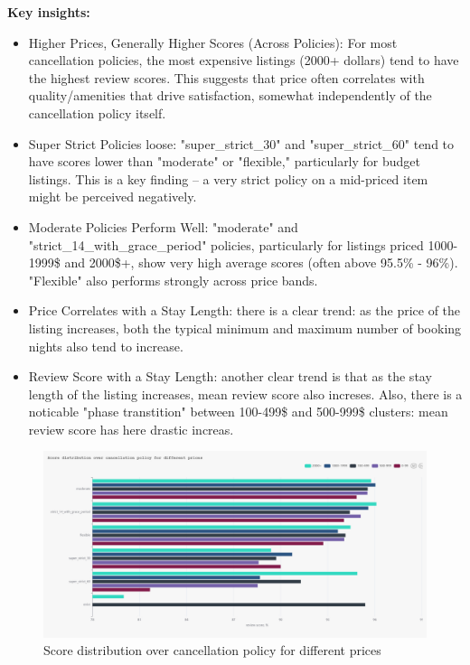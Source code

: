 \vspace{0.5em}
\textbf{Key insights:}
\begin{itemize}
    \item Higher Prices, Generally Higher Scores (Across Policies): For most cancellation policies, the most expensive listings (2000+ dollars) tend to have the highest review scores. This suggests that price often correlates with quality/amenities that drive satisfaction, somewhat independently of the cancellation policy itself.
    \item Super Strict Policies loose: "super\_strict\_30" and "super\_strict\_60" tend to have scores lower than "moderate" or "flexible," particularly for budget listings. This is a key finding – a very strict policy on a mid-priced item might be perceived negatively.
    \item Moderate Policies Perform Well: "moderate" and "strict\_14\_with\_grace\_period" policies, particularly for listings priced 1000-1999\$ and 2000\$+, show very high average scores (often above 95.5\% - 96\%). "Flexible" also performs strongly across price bands.
    \item Price Correlates with a Stay Length: there is a clear trend: as the price of the listing increases, both the typical minimum and maximum number of booking nights also tend to increase.
    \item Review Score with a Stay Length: another clear trend is that as the stay length of the listing increases, mean review score also increses. Also, there is a noticable "phase transtition" between 100-499\$ and 500-999\$ clusters: mean review score has here drastic increas.
\end{itemize}

\vspace{1em}
\begin{figure}[H]
    \centering
    \includegraphics[width=1\textwidth]{images/q2_1.jpg}
    \caption{Score distribution over cancellation policy for different prices}
    \label{fig:figureq3}
\end{figure}

